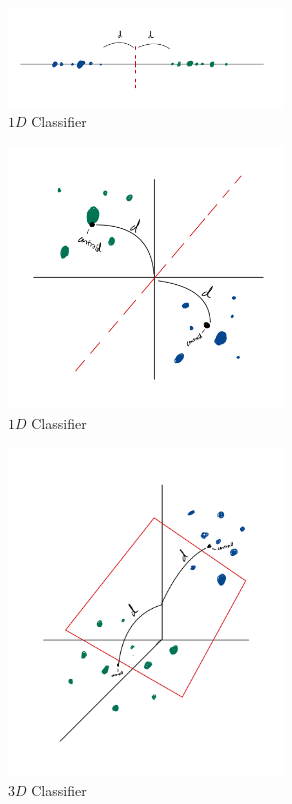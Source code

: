 \documentclass{article}
\begin{document}
\begin{figure}[H]
    \centering
    \includegraphics[width = 0.65\textwidth]{imgs/prob2_a.png}
    \caption{$1D$ Classifier}
    \label{fig:prob2-1}
\end{figure}

\begin{figure}[H]
    \centering
    \includegraphics[width = 0.65\textwidth]{imgs/prob2_b.png}
    \caption{$1D$ Classifier}
    \label{fig:prob2-2}
\end{figure}

\begin{figure}[H]
    \centering
    \includegraphics[width = 0.65\textwidth]{imgs/prob2_c.png}
    \caption{$3D$ Classifier}
    \label{fig:prob2-3}
\end{figure}
\end{document}
